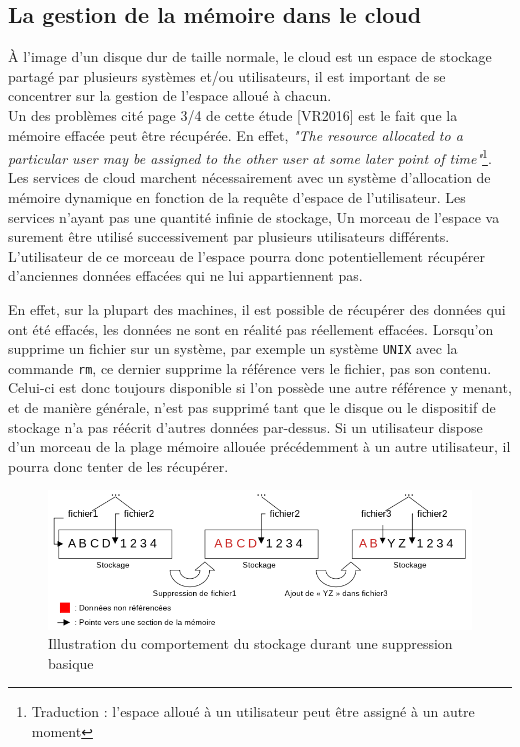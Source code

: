 \documentclass[a4paper, 12pt]{article}
\begin{document}
\begin{spacing}{1.1}
    \subsection{La gestion de la mémoire dans le cloud}
      À l'image d'un disque dur de taille normale, le cloud est un espace de
      stockage partagé par plusieurs systèmes et/ou utilisateurs, il est
      important de se concentrer sur la gestion de l'espace alloué à chacun. \\

      Un des problèmes cité page 3/4 de cette étude [VR2016] est le fait que la
      mémoire effacée peut être récupérée. En effet, \textit{"The resource
      allocated to a particular user may be assigned to the other user at some
      later point of time"}\footnote{Traduction : l'espace alloué à un
      utilisateur peut être assigné à un autre moment}. Les services de cloud
      marchent nécessairement avec un système d'allocation de mémoire dynamique
      en fonction de la requête d'espace de l'utilisateur. Les services n'ayant
      pas une quantité infinie de stockage, Un morceau de l'espace va surement
      être utilisé successivement par plusieurs utilisateurs différents.
      L'utilisateur de ce morceau de l'espace pourra donc potentiellement
      récupérer d'anciennes données effacées qui ne lui appartiennent pas.

      En effet, sur la plupart des machines, il est possible de récupérer des
      données qui ont été effacés, les données ne sont en réalité pas réellement
      effacées. Lorsqu'on supprime un fichier sur un système, par exemple un
      système \verb+UNIX+ avec la commande \verb+rm+, ce dernier supprime la
      référence vers le fichier, pas son contenu. Celui-ci est donc toujours
      disponible si l'on possède une autre référence y menant, et de manière
      générale, n'est pas supprimé tant que le disque ou le dispositif de
      stockage n'a pas réécrit d'autres données par-dessus. Si un utilisateur
      dispose d'un morceau de la plage mémoire allouée précédemment à un autre
      utilisateur, il pourra donc tenter de les récupérer.

      \begin{figure}[h]
        \centering
        \includegraphics[scale=.6]{img/schema_memoire.png}
        \caption{Illustration du comportement du stockage durant une suppression
        basique}
      \end{figure}


\end{spacing}
\end{document}
